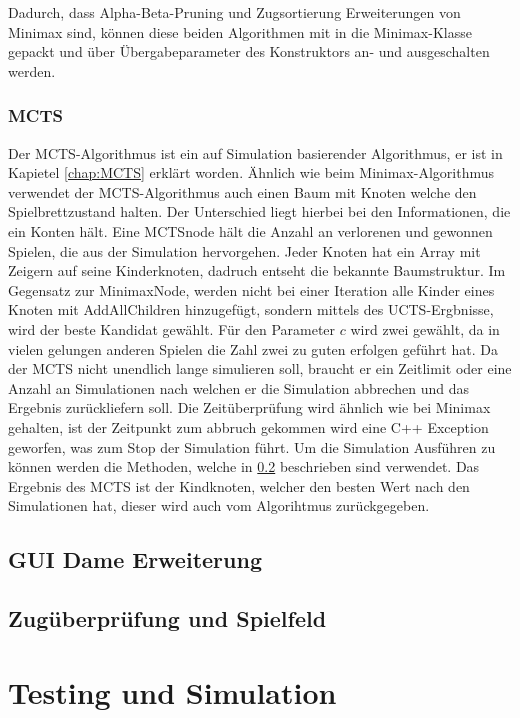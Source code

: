 \documentclass[12pt,a4paper,bibliography=totocnumbered,listof=totocnumbered]{article}
\begin{document}
Dadurch, dass Alpha-Beta-Pruning und Zugsortierung Erweiterungen von Minimax sind, können diese beiden Algorithmen mit in die Minimax-Klasse gepackt
und über Übergabeparameter des Konstruktors an- und ausgeschalten werden. 


\subsubsection{MCTS}
Der MCTS-Algorithmus ist ein auf Simulation basierender Algorithmus, er ist in Kapietel \ref{chap:MCTS} erklärt worden.
Ähnlich wie beim Minimax-Algorithmus verwendet der MCTS-Algorithmus auch einen Baum mit Knoten welche den Spielbrettzustand halten.
Der Unterschied liegt hierbei bei den Informationen, die ein Konten hält. Eine MCTSnode hält die Anzahl an verlorenen und gewonnen Spielen,
die aus der Simulation hervorgehen. Jeder Knoten hat ein Array mit Zeigern auf seine Kinderknoten, dadruch entseht die bekannte Baumstruktur.
Im Gegensatz zur MinimaxNode, werden nicht bei einer Iteration alle Kinder eines Knoten mit AddAllChildren hinzugefügt, sondern mittels des 
UCTS-Ergbnisse, wird der beste Kandidat gewählt. Für den Parameter $c$ wird zwei gewählt, da in vielen gelungen anderen Spielen die Zahl zwei 
zu guten erfolgen geführt hat. Da der MCTS nicht unendlich lange simulieren soll, braucht er ein Zeitlimit oder eine Anzahl an Simulationen
nach welchen er die Simulation abbrechen und das Ergebnis zurückliefern soll. Die Zeitüberprüfung wird ähnlich wie bei Minimax gehalten,
ist der Zeitpunkt zum abbruch gekommen wird eine C++ Exception geworfen, was zum Stop der Simulation führt. 
Um die Simulation Ausführen zu können werden die Methoden, welche in \ref{chap:Moves} beschrieben sind verwendet.
Das Ergebnis des MCTS ist der Kindknoten, welcher den besten Wert nach den Simulationen hat, dieser wird auch vom Algorihtmus zurückgegeben.



\subsection{GUI Dame Erweiterung}

\subsection{Zugüberprüfung und Spielfeld}
\label{chap:Moves}

\section{Testing und Simulation}
\end{document}
